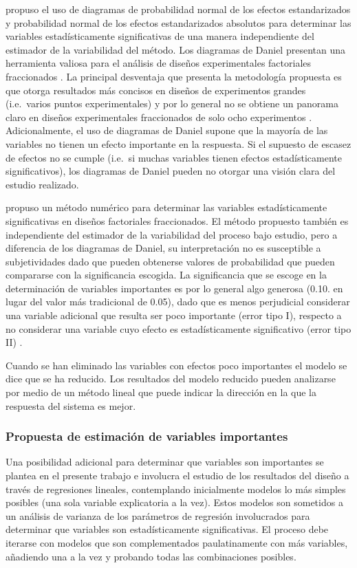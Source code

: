 \citet{Daniel1959} propuso el uso de diagramas de probabilidad normal de los efectos estandarizados y probabilidad normal de los efectos estandarizados absolutos para determinar las variables estadísticamente significativas de una manera independiente del estimador de la variabilidad del método. Los {diagramas de Daniel} presentan una herramienta valiosa para el análisis de diseños experimentales factoriales fraccionados \citep{Box2005}. La principal desventaja que presenta la metodología propuesta es que otorga resultados más concisos en diseños de experimentos grandes (i.e.\ varios puntos experimentales) y por lo general no se obtiene un panorama claro en diseños experimentales fraccionados de solo ocho experimentos \citep{FrF2}. Adicionalmente, el uso de diagramas de Daniel supone que la mayoría de las variables no tienen un efecto importante en la respuesta. Si el supuesto de {escasez de efectos} no se cumple (i.e.\ si muchas va\-ria\-bles tienen efectos estadísticamente significativos), los diagramas de Daniel pueden no otorgar una visión clara del estudio realizado.  

\citet{Lenth1989} propuso un método numérico para determinar las variables estadísticamente significativas en diseños factoriales fraccionados. El método propuesto también es independiente del estimador de la variabilidad del proceso bajo estudio, pero a diferencia de los diagramas de Daniel, su interpretación no es susceptible a subjetividades dado que pueden obtenerse valores de probabilidad que pueden compararse con la significancia escogida. La significancia que se escoge en la determinación de variables importantes es por lo general algo {generosa} (0.10. en lugar del valor más tradicional de 0.05), dado que es menos perjudicial considerar una variable adicional que resulta ser poco importante (error tipo I), respecto a no considerar una variable cuyo efecto es estadísticamente significativo (error tipo II) \citep{FrF2}.

Cuando se han eliminado las variables con efectos poco importantes el modelo se dice que se ha reducido. Los resultados del {modelo reducido} pueden analizarse por medio de un método lineal que puede indicar la dirección en la que la respuesta del sistema es mejor.


\subsubsection{Propuesta de estimación de variables importantes}\label{app:ParedesMethod}
Una posibilidad adicional para determinar que variables son importantes se plantea en el presente trabajo e involucra el estudio de los resultados del diseño a través de regresiones lineales, contemplando inicialmente modelos lo más simples posibles (una sola variable explicatoria a la vez). Estos modelos son sometidos a un análisis de varianza de los parámetros de regresión involucrados para determinar que variables son estadísticamente significativas. El proceso debe iterarse con modelos que son complementados paulatinamente con más variables, añadiendo una a la vez y probando todas las combinaciones posibles.


